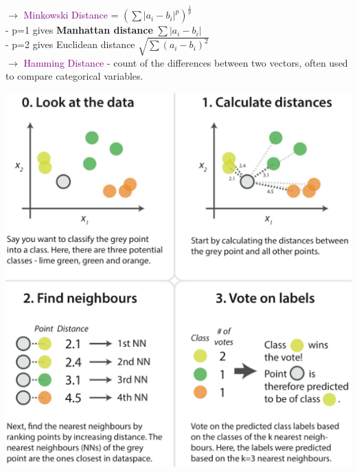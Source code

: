\documentclass[letterpaper, 10.5pt,landscape]{article}
\begin{document}
\begin{multicols*}{3}
$\rightarrow$ \textcolor{purple}{Minkowski Distance} = \(\boxed{\left(\sum| a_{i} - b_{i}|^{p}\right)^{\frac{1}{p}}} \) \\
\hspace{10pt} - p=1 gives \textbf{Manhattan distance} \(\boxed{\sum|a_{i} - b_{i}|} \)  \\
\hspace{10pt} - p=2 gives Euclidean distance \(\boxed{\sqrt{\sum(a_{i} - b_{i})^{2}}} \)\\

\vspace{2pt}
$\rightarrow$ \textcolor{purple}{Hamming Distance} - count of the differences between two vectors, often used to compare categorical variables.



\begin{center}
    \begin{minipage}{\linewidth}
    \includegraphics[width=\textwidth]{figures/knn_steps.PNG}
    \end{minipage}
\end{center}












\end{multicols*}
\end{document}
